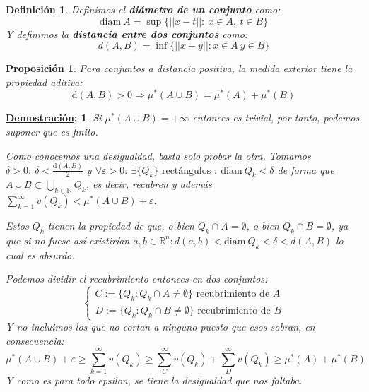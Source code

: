 \documentclass[10pt,a4paper,openright]{book}
\theoremstyle{break}
\newtheorem*{defi}{Definición}
\newtheorem*{prop}{Proposición}
\newtheorem*{demo}{\underline{Demostración}:}
\begin{document}
\begin{defi}
Definimos el \textbf{diámetro de un conjunto} como:
$$\mathrm{diam}\ A = \sup \{\vert \vert x - t \vert  \vert: \ x \in A, \ t \in B \}$$
Y definimos la \textbf{distancia entre dos conjuntos} como:
$$d(A,B) = \inf \{||x-y||: x\in A \ y \in B\}$$
\end{defi}

\begin{prop}
Para conjuntos a distancia positiva, la medida exterior tiene la propiedad aditiva:
$$\mathrm{d}\left( A, B \right) > 0 \Rightarrow \mu^*\left( A \cup B \right) = \mu^*\left( A \right) + \mu^*\left( B \right)$$
\end{prop}
\begin{demo}
Si $ \mu^*\left( A\cup B \right) = +\infty$ entonces es trivial, por tanto, podemos suponer que es finito.

Como conocemos una desigualdad, basta solo probar la otra. Tomamos $\delta > 0: \ \delta < \frac{\mathrm{d}\left( A, B \right)}{2}$ y $\forall \varepsilon > 0: \ \exists \{Q_k\} \text{ rectángulos }: \ \mathrm{diam}\ Q_k < \delta$ de forma que $A\cup B \subset \bigcup_{k \in \mathbb{N}} Q_k$, es decir, recubren y además $\sum_{k=1}^{\infty} v\left( Q_k \right) < \mu^*\left( A\cup B \right) + \varepsilon $.

Estos $Q_k$ tienen la propiedad de que, o bien $Q_k \cap A = \emptyset$, o bien $Q_k \cap B = \emptyset$, ya que si no fuese así existirían $a,b\in \mathbb{R}^n: d(a,b) < \mathrm{diam} \ Q_k < \delta < d(A,B)$ lo cual es absurdo. 

Podemos dividir el recubrimiento entonces en dos conjuntos:
$$ \begin{cases}
C:= \{Q_k : Q_k \cap A \neq \emptyset\} \text{ recubrimiento de } A \\
D:= \{Q_k : Q_k \cap B \neq \emptyset\} \text{ recubrimiento de } B
\end{cases}$$
Y no incluimos los que no cortan a ninguno puesto que esos sobran, en consecuencia:
$$\mu^*(A\cup B) +\varepsilon \geq \sum_{k=1}^{\infty} v\left( Q_k \right) \geq \sum_{C}^{\infty} v\left( Q_k \right) + \sum_{D}^{\infty} v\left( Q_k \right) \geq \mu^*\left( A \right) + \mu^*\left( B \right)$$
Y como es para todo epsilon, se tiene la desigualdad que nos faltaba.
\end{demo}
\end{document}
